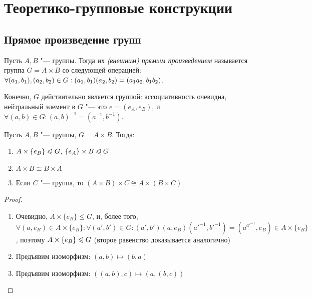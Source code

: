 \section{Теоретико-групповые конструкции}

\subsection{Прямое произведение групп}

\begin{definition}
	Пусть $A, B$ "--- группы. Тогда их \textit{(внешним) прямым произведением} называется группа $G = A \times B$ со следующей операцией: $\forall (a_1, b_1), (a_2, b_2) \in G: (a_1, b_1)(a_2, b_2) \hm= (a_1a_2, b_1b_2)$.
\end{definition}

\begin{note}
	Конечно, $G$ действительно является группой: ассоциативность очевидна, нейтральный элемент в $G$ "--- это $e = (e_A, e_B)$, и $\forall (a, b) \in G: (a, b)^{-1} = (a^{-1}, b^{-1})$.
\end{note}

\begin{proposition}
	Пусть $A, B$ "--- группы, $G = A\times B$. Тогда:
	\begin{enumerate}
		\item $A \times \{e_B\} \trianglelefteqslant G$, $\{e_A\} \times B \trianglelefteqslant G$
		\item $A \times B \cong B \times A$
		\item Если $C$ "--- группа, то $(A \times B) \times C \cong A \times (B \times C)$
	\end{enumerate}
\end{proposition}

\begin{proof}~
	\begin{enumerate}
		\item Очевидно, $A \times \{e_B\} \le G$, и, более того, $\forall (a, e_B) \in A \times \{e_B\}: \forall (a', b') \in G: (a', b')(a, e_B)(a'^{-1}, b'^{-1}) = (a^{a'^{-1}}, e_B) \in A \times \{e_B\}$, поэтому $A \times \{e_B\} \trianglelefteqslant G$ (второе равенство доказывается аналогично)
		\item Предъявим изоморфизм: $(a, b) \mapsto (b, a)$
		\item Предъявим изоморфизм: $((a, b), c) \mapsto (a, (b, c))$
	\end{enumerate}
\end{proof}

